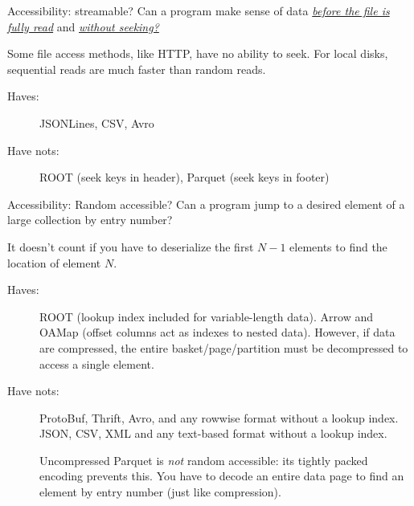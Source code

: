 \documentclass[aspectratio=169]{beamer}
\begin{document}
\begin{frame}{Accessibility: streamable?}
\vspace{0.5 cm}
Can a program make sense of data \underline{\it before the file is fully read} and \underline{\it without seeking?}

\vfill

Some file access methods, like HTTP, have no ability to seek. For local disks, sequential reads are much faster than random reads.

\vfill

\begin{description}
\item[Haves:] JSONLines, CSV, Avro
\item[Have nots:] ROOT (seek keys in header), Parquet (seek keys in footer)
\end{description}
\end{frame}

\begin{frame}{Accessibility: Random accessible?}
\vspace{0.5 cm}
Can a program jump to a desired element of a large collection by entry number?

\vfill
It doesn't count if you have to deserialize the first $N-1$ elements to find the location of element $N$.

\vfill

\begin{description}
\item[Haves:] ROOT (lookup index included for variable-length data). Arrow and OAMap (offset columns act as indexes to nested data). However, if data are compressed, the entire basket/page/partition must be decompressed to access a single element.
\item[Have nots:] ProtoBuf, Thrift, Avro, and any rowwise format without a lookup index. JSON, CSV, XML and any text-based format without a lookup index.

\vspace{0.2 cm}
Uncompressed Parquet is {\it not} random accessible: its tightly packed encoding prevents this. You have to decode an entire data page to find an element by entry number (just like compression).
\end{description}
\end{frame}
\end{document}
